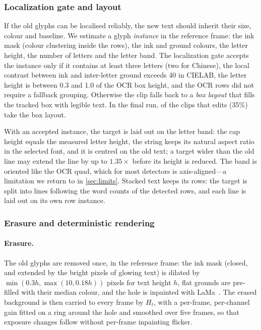\subsubsection{Localization gate and layout}
\label{sec:loc}
If the old glyphs can be localised reliably, the new text should inherit their size, colour and baseline. We estimate a glyph \emph{instance} in the reference frame: the ink mask (colour clustering inside the rows), the ink and ground colours, the letter height, the number of letters and the letter band. The localization gate accepts the instance only if it contains at least three letters (two for Chinese), the local contrast between ink and inter-letter ground exceeds 40 in CIELAB, the letter height is between 0.3 and 1.0 of the OCR box height, and the OCR rows did not require a fallback grouping. Otherwise the clip falls back to a \emph{box layout} that fills the tracked box with legible text. In the final run, \rBoxPolicy{} of the \rOursCollatN{} clips that \method edits (35\%) take the box layout.

With an accepted instance, the target is laid out on the letter band: the cap height equals the measured letter height, the string keeps its natural aspect ratio in the selected font, and it is centred on the old text; a target wider than the old line may extend the line by up to $1.35\times$ before its height is reduced. The band is oriented like the OCR quad, which for most detectors is axis-aligned---a limitation we return to in \cref{sec:limits}. Stacked text keeps its rows: the target is split into lines following the word counts of the detected rows, and each line is laid out on its own row instance.

\subsubsection{Erasure and deterministic rendering}
\label{sec:render}
\paragraph{Erasure.} The old glyphs are removed once, in the reference frame: the ink mask (closed, and extended by the bright pixels of glowing text) is dilated by $\min(0.3h,\max(10,0.18h))$ pixels for text height $h$, flat grounds are pre-filled with their median colour, and the hole is inpainted with LaMa~\cite{suvorov2022lama}. The erased background is then carried to every frame by $H_t$, with a per-frame, per-channel gain fitted on a ring around the hole and smoothed over five frames, so that exposure changes follow without per-frame inpainting flicker.


